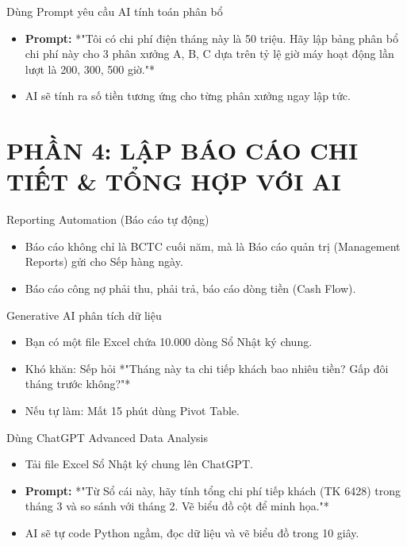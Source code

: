 \documentclass[aspectratio=169]{beamer}
\begin{document}
\begin{frame}{Dùng Prompt yêu cầu AI tính toán phân bổ}
    \begin{itemize}
        \item \textbf{Prompt:} *"Tôi có chi phí điện tháng này là 50 triệu. Hãy lập bảng phân bổ chi phí này cho 3 phân xưởng A, B, C dựa trên tỷ lệ giờ máy hoạt động lần lượt là 200, 300, 500 giờ."*
        \item AI sẽ tính ra số tiền tương ứng cho từng phân xưởng ngay lập tức.
    \end{itemize}
\end{frame}


\section{PHẦN 4: LẬP BÁO CÁO CHI TIẾT \& TỔNG HỢP VỚI AI}


\begin{frame}{Reporting Automation (Báo cáo tự động)}
    \begin{itemize}
        \item Báo cáo không chỉ là BCTC cuối năm, mà là Báo cáo quản trị (Management Reports) gửi cho Sếp hàng ngày.
        \item Báo cáo công nợ phải thu, phải trả, báo cáo dòng tiền (Cash Flow).
    \end{itemize}
\end{frame}


\begin{frame}{Generative AI phân tích dữ liệu}
    \begin{itemize}
        \item Bạn có một file Excel chứa 10.000 dòng Sổ Nhật ký chung.
        \item Khó khăn: Sếp hỏi *"Tháng này ta chi tiếp khách bao nhiêu tiền? Gấp đôi tháng trước không?"*
        \item Nếu tự làm: Mất 15 phút dùng Pivot Table.
    \end{itemize}
\end{frame}


\begin{frame}{Dùng ChatGPT Advanced Data Analysis}
    \begin{itemize}
        \item Tải file Excel Sổ Nhật ký chung lên ChatGPT.
        \item \textbf{Prompt:} *"Từ Sổ cái này, hãy tính tổng chi phí tiếp khách (TK 6428) trong tháng 3 và so sánh với tháng 2. Vẽ biểu đồ cột để minh họa."*
        \item AI sẽ tự code Python ngầm, đọc dữ liệu và vẽ biểu đồ trong 10 giây.
    \end{itemize}
\end{frame}
\end{document}

